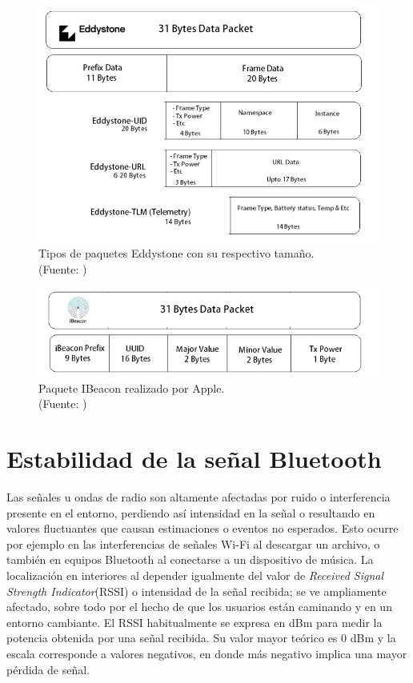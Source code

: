 \begin{figure}[ht!]
\centering
\includegraphics[width=.6\textwidth]{figures/eddystoneProtocol.png}
\caption[Tipos de paquetes Eddystone con su respectivo tamaño]{Tipos de paquetes Eddystone con su respectivo tamaño.\\
{\scriptsize (Fuente: \citep{protocolosBeacon})}}
\label{fig:eddystone}
\end{figure}

\begin{figure}[ht!]
\centering
\includegraphics[width=.6\textwidth]{figures/ibeaconProtocol.png}
\caption[Paquete IBeacon realizado por Apple]{Paquete IBeacon realizado por Apple.\\
{\scriptsize (Fuente: \citep{protocolosBeacon})}}
\label{fig:ibeacon}
\end{figure}

\section{Estabilidad de la señal Bluetooth}

Las señales u ondas de radio son altamente afectadas por ruido o interferencia presente en el entorno, perdiendo así intensidad en la señal o resultando en valores fluctuantes que causan estimaciones o eventos no esperados. Esto ocurre por ejemplo en las interferencias de señales Wi-Fi al descargar un archivo, o también en equipos Bluetooth al conectarse a un dispositivo de música. La localización en interiores al depender igualmente del valor de \textit{Received Signal Strength Indicator}(RSSI) o intensidad de la señal recibida; se ve ampliamente afectado, sobre todo por el hecho de que los usuarios están caminando y en un entorno cambiante. El RSSI habitualmente se expresa en dBm para medir la potencia obtenida por una señal recibida. Su valor mayor teórico es 0 dBm y la escala corresponde a valores negativos, en donde más negativo implica una mayor pérdida de señal.

